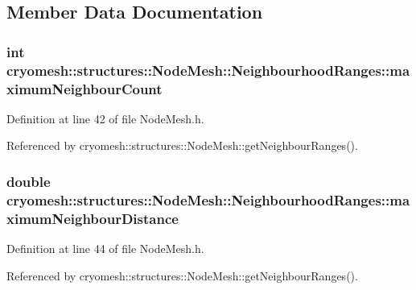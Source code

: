 \subsection{\-Member \-Data \-Documentation}
\hypertarget{structcryomesh_1_1structures_1_1NodeMesh_1_1NeighbourhoodRanges_a69233448f52c9718f855703f61509180}{
\subsubsection[{maximum\-Neighbour\-Count}]{\setlength{\rightskip}{0pt plus 5cm}int {\bf cryomesh\-::structures\-::\-Node\-Mesh\-::\-Neighbourhood\-Ranges\-::maximum\-Neighbour\-Count}}}\label{structcryomesh_1_1structures_1_1NodeMesh_1_1NeighbourhoodRanges_a69233448f52c9718f855703f61509180}


\-Definition at line 42 of file \-Node\-Mesh.\-h.



\-Referenced by cryomesh\-::structures\-::\-Node\-Mesh\-::get\-Neighbour\-Ranges().

\hypertarget{structcryomesh_1_1structures_1_1NodeMesh_1_1NeighbourhoodRanges_af4f46742b43f5284a702150f69853c0d}{
\subsubsection[{maximum\-Neighbour\-Distance}]{\setlength{\rightskip}{0pt plus 5cm}double {\bf cryomesh\-::structures\-::\-Node\-Mesh\-::\-Neighbourhood\-Ranges\-::maximum\-Neighbour\-Distance}}}\label{structcryomesh_1_1structures_1_1NodeMesh_1_1NeighbourhoodRanges_af4f46742b43f5284a702150f69853c0d}


\-Definition at line 44 of file \-Node\-Mesh.\-h.



\-Referenced by cryomesh\-::structures\-::\-Node\-Mesh\-::get\-Neighbour\-Ranges().

